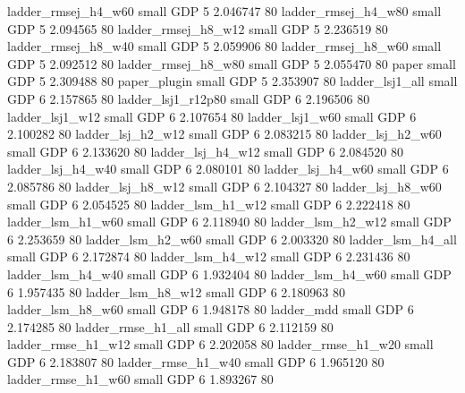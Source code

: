      ladder_rmsej_h4_w60      small      GDP                 5 2.046747 80
     ladder_rmsej_h4_w80      small      GDP                 5 2.094565 80
     ladder_rmsej_h8_w12      small      GDP                 5 2.236519 80
     ladder_rmsej_h8_w40      small      GDP                 5 2.059906 80
     ladder_rmsej_h8_w60      small      GDP                 5 2.092512 80
     ladder_rmsej_h8_w80      small      GDP                 5 2.055470 80
                   paper      small      GDP                 5 2.309488 80
            paper_plugin      small      GDP                 5 2.353907 80
         ladder_lsj1_all      small      GDP                 6 2.157865 80
      ladder_lsj1_r12p80      small      GDP                 6 2.196506 80
         ladder_lsj1_w12      small      GDP                 6 2.107654 80
         ladder_lsj1_w60      small      GDP                 6 2.100282 80
       ladder_lsj_h2_w12      small      GDP                 6 2.083215 80
       ladder_lsj_h2_w60      small      GDP                 6 2.133620 80
       ladder_lsj_h4_w12      small      GDP                 6 2.084520 80
       ladder_lsj_h4_w40      small      GDP                 6 2.080101 80
       ladder_lsj_h4_w60      small      GDP                 6 2.085786 80
       ladder_lsj_h8_w12      small      GDP                 6 2.104327 80
       ladder_lsj_h8_w60      small      GDP                 6 2.054525 80
       ladder_lsm_h1_w12      small      GDP                 6 2.222418 80
       ladder_lsm_h1_w60      small      GDP                 6 2.118940 80
       ladder_lsm_h2_w12      small      GDP                 6 2.253659 80
       ladder_lsm_h2_w60      small      GDP                 6 2.003320 80
       ladder_lsm_h4_all      small      GDP                 6 2.172874 80
       ladder_lsm_h4_w12      small      GDP                 6 2.231436 80
       ladder_lsm_h4_w40      small      GDP                 6 1.932404 80
       ladder_lsm_h4_w60      small      GDP                 6 1.957435 80
       ladder_lsm_h8_w12      small      GDP                 6 2.180963 80
       ladder_lsm_h8_w60      small      GDP                 6 1.948178 80
              ladder_mdd      small      GDP                 6 2.174285 80
      ladder_rmse_h1_all      small      GDP                 6 2.112159 80
      ladder_rmse_h1_w12      small      GDP                 6 2.202058 80
      ladder_rmse_h1_w20      small      GDP                 6 2.183807 80
      ladder_rmse_h1_w40      small      GDP                 6 1.965120 80
      ladder_rmse_h1_w60      small      GDP                 6 1.893267 80

